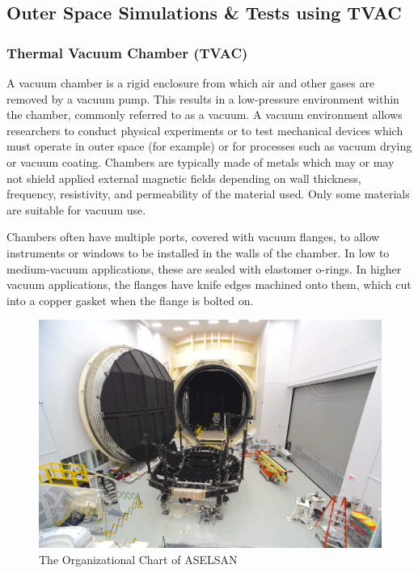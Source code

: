 \subsection{Outer Space Simulations \& Tests using TVAC  }

\subsubsection{Thermal Vacuum Chamber (TVAC) }

	A vacuum chamber is a rigid enclosure from which air and other gases are removed by a vacuum pump. This results in a low-pressure environment within the chamber, commonly referred to as a vacuum. A vacuum environment allows researchers to conduct physical experiments or to test mechanical devices which must operate in outer space (for example) or for processes such as vacuum drying or vacuum coating. Chambers are typically made of metals which may or may not shield applied external magnetic fields depending on wall thickness, frequency, resistivity, and permeability of the material used. Only some materials are suitable for vacuum use.

Chambers often have multiple ports, covered with vacuum flanges, to allow instruments or windows to be installed in the walls of the chamber. In low to medium-vacuum applications, these are sealed with elastomer o-rings. In higher vacuum applications, the flanges have knife edges machined onto them, which cut into a copper gasket when the flange is bolted on.

\begin{figure}[H]
	\center
	\setlength{\unitlength}{\textwidth} 
	\includegraphics[width=1.0\unitlength]{tvac}
	\caption{\label{fig:tvac}The Organizational Chart of ASELSAN }
\end{figure}

